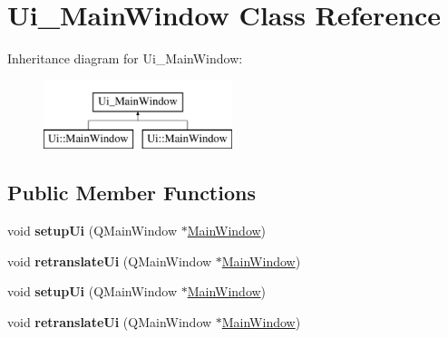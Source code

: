 \hypertarget{classUi__MainWindow}{\section{Ui\-\_\-\-Main\-Window Class Reference}
\label{classUi__MainWindow}
}
Inheritance diagram for Ui\-\_\-\-Main\-Window\-:\begin{figure}[H]
\begin{center}
\leavevmode
\includegraphics[height=2.000000cm]{classUi__MainWindow}
\end{center}
\end{figure}
\subsection*{Public Member Functions}
\begin{DoxyCompactItemize}
\item 
\hypertarget{classUi__MainWindow_acf4a0872c4c77d8f43a2ec66ed849b58}{void {\bfseries setup\-Ui} (Q\-Main\-Window $\ast$\hyperlink{classMainWindow}{Main\-Window})}\label{classUi__MainWindow_acf4a0872c4c77d8f43a2ec66ed849b58}

\item 
\hypertarget{classUi__MainWindow_a097dd160c3534a204904cb374412c618}{void {\bfseries retranslate\-Ui} (Q\-Main\-Window $\ast$\hyperlink{classMainWindow}{Main\-Window})}\label{classUi__MainWindow_a097dd160c3534a204904cb374412c618}

\item 
\hypertarget{classUi__MainWindow_acf4a0872c4c77d8f43a2ec66ed849b58}{void {\bfseries setup\-Ui} (Q\-Main\-Window $\ast$\hyperlink{classMainWindow}{Main\-Window})}\label{classUi__MainWindow_acf4a0872c4c77d8f43a2ec66ed849b58}

\item 
\hypertarget{classUi__MainWindow_a097dd160c3534a204904cb374412c618}{void {\bfseries retranslate\-Ui} (Q\-Main\-Window $\ast$\hyperlink{classMainWindow}{Main\-Window})}\label{classUi__MainWindow_a097dd160c3534a204904cb374412c618}

\end{DoxyCompactItemize}
